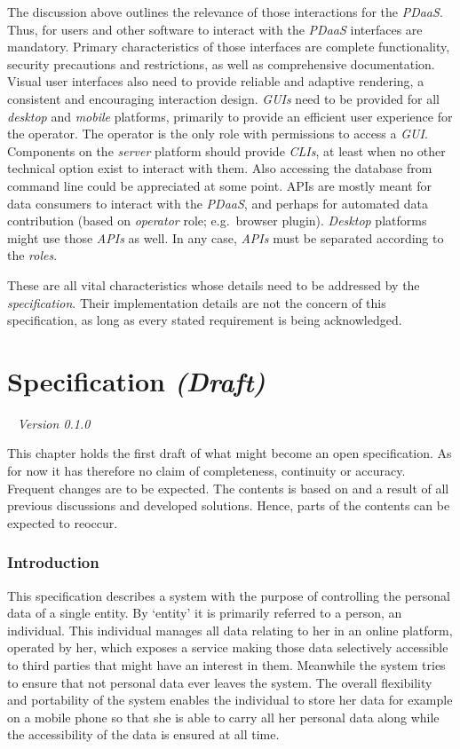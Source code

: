 \documentclass[12pt,english,a4paper,titlepage,cleardoublepage=empty,dottedtoc]{report}
\begin{document}
The discussion above outlines the relevance of those interactions for
the \emph{PDaaS}. Thus, for users and other software to interact with
the \emph{PDaaS} interfaces are mandatory. Primary characteristics of
those interfaces are complete functionality, security precautions and
restrictions, as well as comprehensive documentation. Visual user
interfaces also need to provide reliable and adaptive rendering, a
consistent and encouraging interaction design. \emph{GUIs} need to be
provided for all \emph{desktop} and \emph{mobile} platforms, primarily
to provide an efficient user experience for the operator. The operator
is the only role with permissions to access a \emph{GUI}. Components on
the \emph{server} platform should provide \emph{CLIs}, at least when no
other technical option exist to interact with them. Also accessing the
database from command line could be appreciated at some point. APIs are
mostly meant for data consumers to interact with the \emph{PDaaS}, and
perhaps for automated data contribution (based on \emph{operator} role;
e.g.~browser plugin). \emph{Desktop} platforms might use those
\emph{APIs} as well. In any case, \emph{APIs} must be separated
according to the \emph{roles}.

These are all vital characteristics whose details need to be addressed
by the \emph{specification}. Their implementation details are not the
concern of this specification, as long as every stated requirement is
being acknowledged.

\chapter{\texorpdfstring{Specification
\emph{(Draft)}}{Specification (Draft)}}\label{specification-draft}

\hfill~ \emph{Version 0.1.0}

This chapter holds the first draft of what might become an open
specification. As for now it has therefore no claim of completeness,
continuity or accuracy. Frequent changes are to be expected. The
contents is based on and a result of all previous discussions and
developed solutions. Hence, parts of the contents can be expected to
reoccur.

\subsection*{Introduction}\label{introduction-1}

This specification describes a system with the purpose of controlling
the personal data of a single entity. By `entity' it is primarily
referred to a person, an individual. This individual manages all data
relating to her in an online platform, operated by her, which exposes a
service making those data selectively accessible to third parties that
might have an interest in them. Meanwhile the system tries to ensure
that not personal data ever leaves the system. The overall flexibility
and portability of the system enables the individual to store her data
for example on a mobile phone so that she is able to carry all her
personal data along while the accessibility of the data is ensured at
all time.
\end{document}
